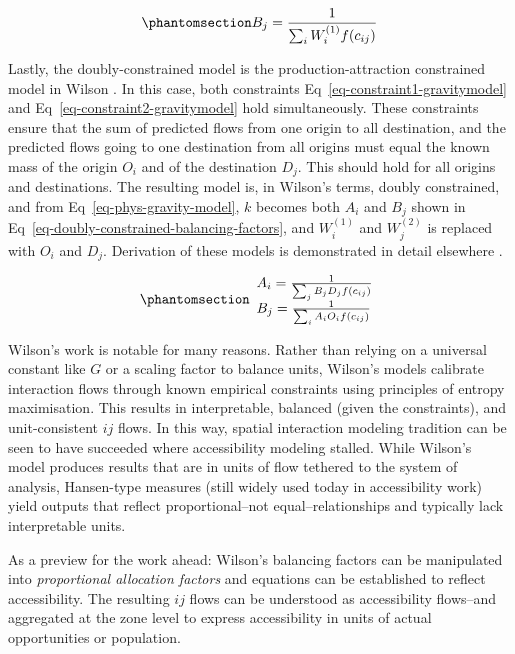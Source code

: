 \documentclass[
  10pt,
  letterpaper,
]{article}
\begin{document}
\begin{equation}\phantomsection\label{eq-attraction-constrained-balancing-factor}{
B_j = \frac{1}{\sum_i W_i^{(1)} f(c_{ij})}
}\end{equation}

Lastly, the doubly-constrained model is the production-attraction
constrained model in Wilson \citep{wilson1971}. In this case, both
constraints Eq~\ref{eq-constraint1-gravitymodel} and
Eq~\ref{eq-constraint2-gravitymodel} hold simultaneously. These
constraints ensure that the sum of predicted flows from one origin to
all destination, and the predicted flows going to one destination from
all origins must equal the known mass of the origin \(O_i\) and of the
destination \(D_j\). This should hold for all origins and destinations.
The resulting model is, in Wilson's terms, doubly constrained, and from
Eq~\ref{eq-phys-gravity-model}, \(k\) becomes both \(A_i\) and \(B_j\)
shown in Eq~\ref{eq-doubly-constrained-balancing-factors}, and
\(W_i^{(1)}\) and \(W_j^{(2)}\) is replaced with \(O_i\) and \(D_j\).
Derivation of these models is demonstrated in detail elsewhere
\citep[e.g.,][]{ortuzar_2011_modelling, wilsonSTATISTICALTHEORYSPATIAL1967}.

\begin{equation}\phantomsection\label{eq-doubly-constrained-balancing-factors}{
\begin{array}{l}
A_i = \frac{1}{\sum_j B_j D_j f(c_{ij})}\\
B_j = \frac{1}{\sum_i A_i O_i f(c_{ij})}
\end{array}
}\end{equation}

Wilson's work is notable for many reasons. Rather than relying on a
universal constant like \(G\) or a scaling factor to balance units,
Wilson's models calibrate interaction flows through known empirical
constraints using principles of entropy maximisation. This results in
interpretable, balanced (given the constraints), and unit-consistent
\(ij\) flows. In this way, spatial interaction modeling tradition can be
seen to have succeeded where accessibility modeling stalled. While
Wilson's model produces results that are in units of flow tethered to
the system of analysis, Hansen-type measures (still widely used today in
accessibility work) yield outputs that reflect proportional--not
equal--relationships and typically lack interpretable units.

As a preview for the work ahead: Wilson's balancing factors can be
manipulated into \emph{proportional allocation factors} and equations
can be established to reflect accessibility. The resulting \(ij\) flows
can be understood as accessibility flows--and aggregated at the zone
level to express accessibility in units of actual opportunities or
population.
\end{document}

